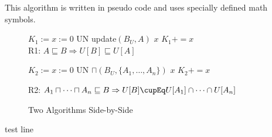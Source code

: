 
This algorithm is written in pseudo code and uses specially defined
math symbols.

\begin{figure}[b]
\begin{minipage}{.5\textwidth}
\begin{algorithm}[H]\small
  $K_1  := x := 0$\;
   {
    UN \bang update$(B_{U}, A)$ \query $x$\;
    $K_1 += x$\;
  }
~\\[4mm]
  \caption{\small R1: $A \sqsubseteq B \Rightarrow U[B] \sqsubseteq U[A]$}
  \label{pseudo-R1-2}
\end{algorithm}
\end{minipage}
\textcolor{Gray}\quad\textcolor{Gray}{\vrule}\quad
\begin{minipage}{.5\textwidth}
\begin{algorithm}[H]\small
  $K_2 := x := 0$\;
   {
    UN \bang $\sqcap(B_{U}, \{A_1, \dots, A_n\})$ \query $x$\;
    $K_2 += x$\;
  }
  \label{pseudo-R2-2}
  \caption{\small R2: $A_1 \sqcap\dots\sqcap A_n\sqsubseteq B \Rightarrow
    U[B] \cupEq U[A_1] \cap \dots \cap U[A_n]$}
\end{algorithm}
\end{minipage}
\caption{Two Algorithms Side-by-Side}
\end{figure}

test line
\label{TwoAlgs}
